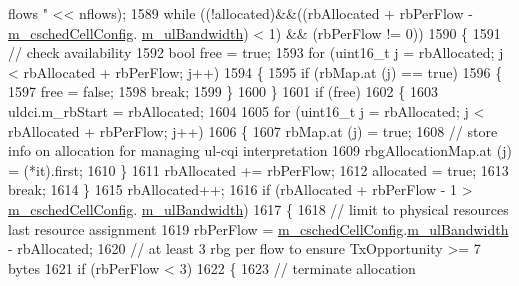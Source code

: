 \begin{DoxyCode}
{       flows "} << nflows);
1589       \textcolor{keywordflow}{while} ((!allocated)&&((rbAllocated + rbPerFlow - \hyperlink{classns3_1_1FdMtFfMacScheduler_a9f2e3c6bfae8bfc266a84f64e5937ac8}{m\_cschedCellConfig}.
      \hyperlink{structns3_1_1FfMacCschedSapProvider_1_1CschedCellConfigReqParameters_a5ab5b102878e6e7e7727a14af4a64d2f}{m\_ulBandwidth}) < 1) && (rbPerFlow != 0))
1590         \{
1591           \textcolor{comment}{// check availability}
1592           \textcolor{keywordtype}{bool} free = \textcolor{keyword}{true};
1593           \textcolor{keywordflow}{for} (uint16\_t j = rbAllocated; j < rbAllocated + rbPerFlow; j++)
1594             \{
1595               \textcolor{keywordflow}{if} (rbMap.at (j) == \textcolor{keyword}{true})
1596                 \{
1597                   free = \textcolor{keyword}{false};
1598                   \textcolor{keywordflow}{break};
1599                 \}
1600             \}
1601           \textcolor{keywordflow}{if} (free)
1602             \{
1603               uldci.m\_rbStart = rbAllocated;
1604 
1605               \textcolor{keywordflow}{for} (uint16\_t j = rbAllocated; j < rbAllocated + rbPerFlow; j++)
1606                 \{
1607                   rbMap.at (j) = \textcolor{keyword}{true};
1608                   \textcolor{comment}{// store info on allocation for managing ul-cqi interpretation}
1609                   rbgAllocationMap.at (j) = (*it).first;
1610                 \}
1611               rbAllocated += rbPerFlow;
1612               allocated = \textcolor{keyword}{true};
1613               \textcolor{keywordflow}{break};
1614             \}
1615           rbAllocated++;
1616           \textcolor{keywordflow}{if} (rbAllocated + rbPerFlow - 1 > \hyperlink{classns3_1_1FdMtFfMacScheduler_a9f2e3c6bfae8bfc266a84f64e5937ac8}{m\_cschedCellConfig}.
      \hyperlink{structns3_1_1FfMacCschedSapProvider_1_1CschedCellConfigReqParameters_a5ab5b102878e6e7e7727a14af4a64d2f}{m\_ulBandwidth})
1617             \{
1618               \textcolor{comment}{// limit to physical resources last resource assignment}
1619               rbPerFlow = \hyperlink{classns3_1_1FdMtFfMacScheduler_a9f2e3c6bfae8bfc266a84f64e5937ac8}{m\_cschedCellConfig}.\hyperlink{structns3_1_1FfMacCschedSapProvider_1_1CschedCellConfigReqParameters_a5ab5b102878e6e7e7727a14af4a64d2f}{m\_ulBandwidth} - rbAllocated;
1620               \textcolor{comment}{// at least 3 rbg per flow to ensure TxOpportunity >= 7 bytes}
1621               \textcolor{keywordflow}{if} (rbPerFlow < 3)
1622                 \{
1623                   \textcolor{comment}{// terminate allocation}

\end{DoxyCode}
